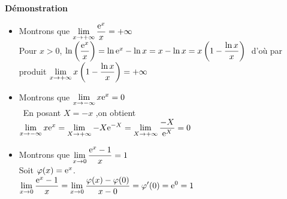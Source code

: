 \textbf{Démonstration}
\begin{itemize}
\item   Montrons que $ \displaystyle\lim_{x \to +\infty}\dfrac{\mathrm{e}^{x}}{x}=+\infty $ \\  
 Pour $ x > 0 $,\; $ \ln  \left(\dfrac{\mathrm{e}^{x}}{x}\right)  =\ln \mathrm{e}^{x}-\ln x  =x-\ln x  =x\left(1-\dfrac{\ln x}{x}\right)\; $   d'où par produit  $\displaystyle \lim_{x \to +\infty}x\left(1-\dfrac{\ln x}{x}\right)=+\infty $
 
 \item   Montrons que\; $ \displaystyle\lim_{x \to -\infty}x\mathrm{e}^{x}=0 $ \\\ 
 En posant $ X=-x $ ,\;on obtient $\displaystyle \lim_{x \to -\infty}x\mathrm{e}^{x}=\lim_{X \to +\infty}-X\mathrm{e}^{-X} = \displaystyle\lim_{X \to +\infty}\dfrac{-X}{\mathrm{e}^{X}}=0$ 
 \item  Montrons que\; $ \displaystyle\lim_{x \to 0} \dfrac{\mathrm{e}^{x}-1}{x}=1 $\\
  Soit $ \varphi (x)=\mathrm{e}^{x}$.\\
  $\displaystyle \lim_{x \to 0}  \dfrac{\mathrm{e}^{x}-1}{x} =\displaystyle\lim_{x \to 0}  \dfrac{\varphi(x)-\varphi(0)}{x-0} = \varphi'(0)=\mathrm{e}^{0}=1$
  \end{itemize}





